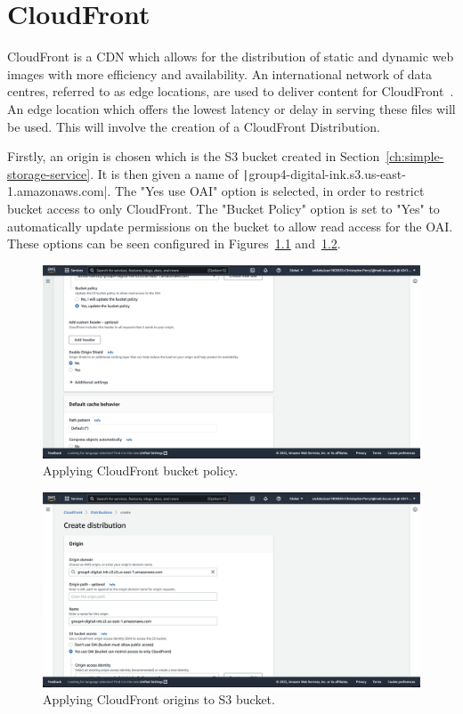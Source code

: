 \chapter{CloudFront}\label{ch:cloudfront}

CloudFront is a CDN which allows for the distribution of static and dynamic web images with more efficiency and
availability.
An international network of data centres, referred to as edge locations, are used to deliver content for
CloudFront~\parencite{amazon2022low}.
An edge location which offers the lowest latency or delay in serving these files will be used.
This will involve the creation of a CloudFront Distribution.

Firstly, an origin is chosen which is the S3 bucket created in Section~\ref{ch:simple-storage-service}.
It is then given a name of \texttt|group4-digital-ink.s3.us-east-1.amazonaws.com|.
The "Yes use OAI" option is selected, in order to restrict bucket access to only CloudFront.
The "Bucket Policy" option is set to "Yes" to automatically update permissions on the bucket to allow read access for
the OAI.
These options can be seen configured in Figures~\ref{fig:cloudfront-bucket-policy} and~\ref{fig:cloudfront-origins}.

\begin{figure}[!htbp]
    \centering
    \includegraphics[width=125mm]{resources/cloudfront/cloudfront-bucket-policy}
    \caption{Applying CloudFront bucket policy.}
    \label{fig:cloudfront-bucket-policy}
\end{figure}

\clearpage
\begin{figure}[!htbp]
    \centering
    \includegraphics[width=\textwidth]{resources/cloudfront/cloudfront-origin}
    \caption{Applying CloudFront origins to S3 bucket.}
    \label{fig:cloudfront-origins}
\end{figure}

